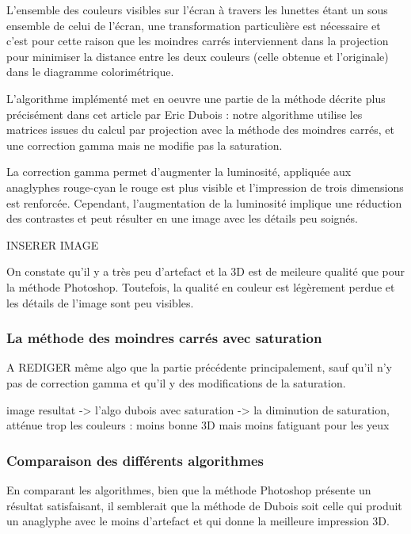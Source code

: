 	L'ensemble des couleurs visibles sur l'écran à travers les lunettes étant un sous ensemble de celui de l'écran, une transformation particulière est nécessaire et c'est pour cette raison que les moindres carrés interviennent dans la projection pour minimiser la distance entre les deux couleurs (celle obtenue et l'originale) dans le diagramme colorimétrique.
	
	L'algorithme implémenté met en oeuvre une partie de la méthode décrite plus précisément dans cet article par Eric Dubois \cite{algoMoindreCarres} : notre algorithme utilise les matrices issues du calcul par projection avec la méthode des moindres carrés, et une correction gamma mais ne modifie pas la saturation.
	
	La correction gamma permet d'augmenter la luminosité, appliquée aux anaglyphes rouge-cyan le rouge est plus visible et l'impression de trois dimensions est renforcée. Cependant, l'augmentation de la luminosité implique une réduction des contrastes et peut résulter en une image avec les détails peu soignés.

	INSERER IMAGE
	
	On constate qu'il y a très peu d'artefact et la 3D est de meileure qualité que pour la méthode Photoshop. Toutefois, la qualité en couleur est légèrement perdue et les détails de l'image sont peu visibles. 
	

\subsubsection{La méthode des moindres carrés avec saturation}


A REDIGER
même algo que la partie précédente principalement, sauf qu'il n'y pas de correction gamma et qu'il y des modifications de la saturation.

image resultat -> l'algo dubois avec saturation -> la diminution de saturation, atténue trop les couleurs : moins bonne 3D mais moins fatiguant pour les yeux 

\subsubsection{Comparaison des différents algorithmes}

En comparant les algorithmes, bien que la méthode Photoshop présente un résultat satisfaisant, il semblerait que la méthode de Dubois \cite{algoDubois}  soit celle qui produit un anaglyphe avec le moins d'artefact et qui donne la meilleure impression 3D. 

